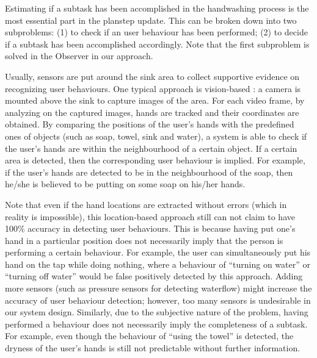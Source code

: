 Estimating if a subtask has been accomplished in the handwashing process is the most essential part in the planstep update. This can be broken down into two subproblems: (1) to check if an user behaviour has been performed; (2) to decide if a subtask has been accomplished accordingly. Note that the first subproblem is solved in the Observer in our approach.

Usually, sensors are put around the sink area to collect supportive evidence on recognizing user behaviours. One typical approach is vision-based \cite{hoey2006tracking, mihailidis2004use, czarnuch2014}: a camera is mounted above the sink to capture images of the area. For each video frame, by analyzing on the captured images, hands are tracked and their coordinates are obtained. By comparing the positions of the user's hands with the predefined ones of objects (such as soap, towel, sink and water), a system is able to check if the user's hands are within the neighbourhood of a certain object. If a certain area is detected, then the corresponding user behaviour is implied. For example, if the user's hands are detected to be in the neighbourhood of the soap, then he/she is believed to be putting on some soap on his/her hands. 

Note that even if the hand locations are extracted without errors (which in reality is impossible), this location-based approach still can not claim to have 100\% accuracy in detecting user behaviours. This is because having put one's hand in a particular position does not necessarily imply that the person is performing a certain behaviour. For example, the user can simultaneously put his hand on the tap while doing nothing, where a behaviour of ``turning on water'' or ``turning off water'' would be false positively detected by this approach. Adding more sensors (such as pressure sensors for detecting waterflow) might increase the accuracy of user behaviour detection; however, too many sensors is undesirable in our system design. Similarly, due to the subjective nature of the problem, having performed a behaviour does not necessarily imply the completeness of a subtask. For example, even though the behaviour of ``using the towel'' is detected, the dryness of the user's hands is still not predictable without further information. 

